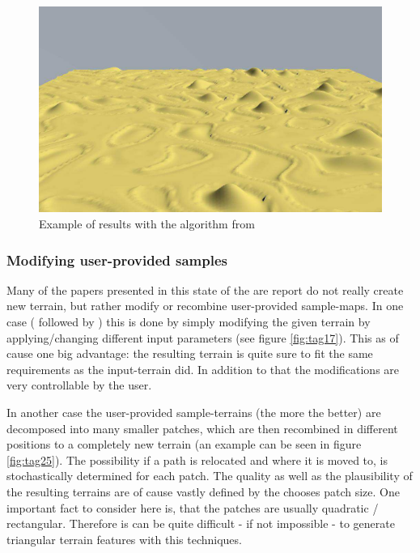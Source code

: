 \begin{figure}[htb]
	\centering
	\includegraphics[width=\linewidth]{RZL12/06256610.jpg}
	\caption{Example of results with the algorithm from \cite{frade2010evolution2}}
	\label{fig:tag21}
\end{figure}

\subsubsection{Modifying user-provided samples}
Many of the papers presented in this state of the are report do not really create new terrain, but rather modify or recombine user-provided sample-maps. In one case (\cite{walsh2010terrain} followed by \cite{walsh2011use}) this is done by simply modifying the given terrain by applying/changing different input parameters (see figure \ref{fig:tag17}). This as of cause one big advantage: the resulting terrain is quite sure to fit the same requirements as the input-terrain did. In addition to that the modifications are very controllable by the user.

In another case \cite{raffe2011evolving} the user-provided sample-terrains (the more the better) are decomposed into many smaller patches, which are then recombined in different positions to a completely new terrain (an example can be seen in figure \ref{fig:tag25}). The possibility if a path is relocated and where it is moved to, is stochastically determined for each patch. The quality as well as the plausibility of the resulting terrains are of cause vastly defined by the chooses patch size. One important fact to consider here is, that the patches are usually quadratic / rectangular. Therefore is can be quite difficult - if not impossible - to generate triangular terrain features with this techniques.

